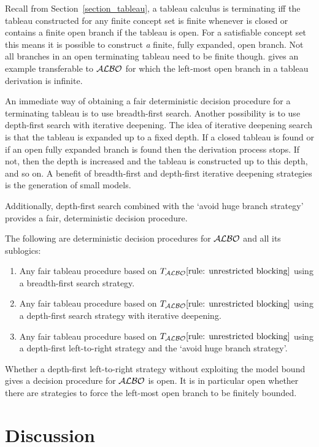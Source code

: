 \documentclass[leqno
,pdflatex
,prodmode
,acmtocl
]{acmsmall}
\newcommand{\mathcmd}[1]{\ensuremath{#1}\xspace}
\newcommand{\dlfont}{\mathcal}
\newcommand{\dl}[1]{\mathcmd{\dlfont{#1}}}
\newcommand{\ALBOid}{\dl{ALBO\smash[t]{\mbox{}}}}
\newcommand{\TALBOidub}{\mathcmd{T_\ALBOid\eqref{rule: unrestricted blocking}}}
\begin{document}
Recall from Section~\ref{section_tableau}, a tableau calculus is terminating iff the tableau
constructed for any finite concept set  is finite whenever  is closed or
contains a finite open
branch if the tableau is open.
For a satisfiable concept set this means it is possible to construct
\emph{a} finite, fully expanded, open branch.
Not all branches in an open terminating tableau need to be finite though.
 gives an example transferable to \ALBOid
for which the left-most open branch in a tableau derivation is infinite.

An immediate way of obtaining a fair deterministic decision
procedure for a terminating tableau is to use breadth-first search.
Another possibility is to use depth-first search with iterative
deepening.
The idea of iterative deepening search is that the tableau is
expanded up to a fixed depth. 
If a closed tableau is found or if an open fully expanded branch is
found then the derivation process stops.
If not, then the depth is increased and the tableau is constructed up to
this depth, and so on.
A benefit of breadth-first and depth-first iterative deepening
strategies is the generation of small models.

Additionally, depth-first search combined with the `avoid huge branch
strategy' provides a fair, deterministic decision procedure.

\begin{theorem}
The following are deterministic decision procedures for
\ALBOid and all its sublogics:
\begin{enumerate}
 \item 
Any fair tableau procedure based on \TALBOidub using a breadth-first 
search strategy.
\item 
Any fair tableau procedure based on \TALBOidub using a depth-first search strategy
with iterative deepening.
 \item 
Any fair tableau procedure based on \TALBOidub using a depth-first
left-to-right strategy and the `avoid huge branch strategy'.\end{enumerate}
\end{theorem}

Whether a depth-first left-to-right strategy without exploiting the model bound
gives a decision procedure for \ALBOid  is open.
It is in particular open whether there are strategies to force the left-most
open branch to be finitely bounded.

\section{Discussion}
\label{section_discussion}
\end{document}
